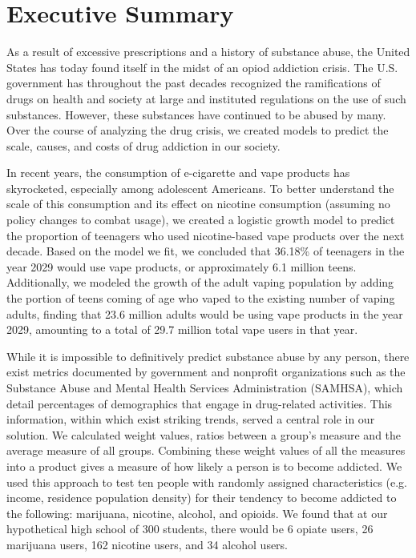 \documentclass[12pt]{article}
\begin{document}

\section*{Executive Summary}
As a result of excessive prescriptions and a history of substance abuse, the United States has today found itself in the midst of an opiod addiction crisis. The U.S. government has throughout the past decades recognized the ramifications of drugs on health and society at large and instituted regulations on the use of such substances. However, these substances have continued to be abused by many. Over the course of analyzing the drug crisis, we created models to predict the scale, causes, and costs of drug addiction in our society.

In recent years, the consumption of e-cigarette and vape products has skyrocketed, especially among adolescent Americans. To better understand the scale of this consumption and its effect on nicotine consumption (assuming no policy changes to combat usage), we created a logistic growth model to predict the proportion of teenagers who used nicotine-based vape products over the next decade. Based on the model we fit, we concluded that 36.18\% of teenagers in the year 2029 would use vape products, or approximately 6.1 million teens. Additionally, we modeled the growth of the adult vaping population by adding the portion of teens coming of age who vaped to the existing number of vaping adults, finding that 23.6 million adults would be using vape products in the year 2029, amounting to a total of 29.7 million total vape users in that year.

While it is impossible to definitively predict substance abuse by any person, there exist metrics documented by government and nonprofit organizations such as the Substance Abuse and Mental Health Services Administration (SAMHSA), which detail percentages of demographics that engage in drug-related activities. This information, within which exist striking trends, served a central role in our solution. We calculated weight values, ratios between a group’s measure and the average measure of all groups. Combining these weight values of all the measures into a product gives a measure of how likely a person is to become addicted. We used this approach to test ten people with randomly assigned characteristics (e.g. income, residence population density) for their tendency to become addicted to the following: marijuana, nicotine, alcohol, and opioids. We found that at our hypothetical high school of 300 students, there would be 6 opiate users, 26 marijuana users, 162 nicotine users, and 34 alcohol users.
\end{document}
